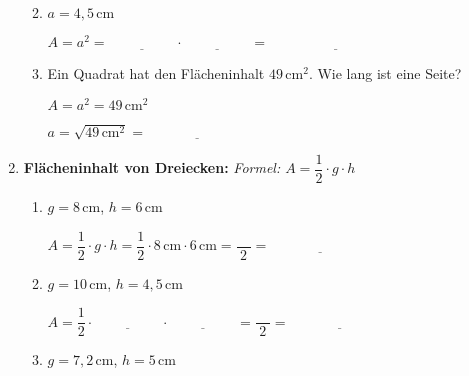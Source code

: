 \begin{enumerate}[label=\arabic*.]
\begin{enumerate}[label=\alph*)]
        \vspace{0.5cm}

        \item $a = 4{,}5\,\text{cm}$

        $A = a^2 = \underline{\hspace{2cm}} \cdot \underline{\hspace{2cm}} = \underline{\hspace{4cm}}$

        \vspace{0.5cm}

        \item Ein Quadrat hat den Flächeninhalt $49\,\text{cm}^2$. Wie lang ist eine Seite?

        $A = a^2 = 49\,\text{cm}^2$

        $a = \sqrt{49\,\text{cm}^2} = \underline{\hspace{3cm}}$
    \end{enumerate}

    \vspace{1cm}

    \item \textbf{Flächeninhalt von Dreiecken:}
    \textit{Formel: $A = \dfrac{1}{2} \cdot g \cdot h$}
    \vspace{0.5cm}

    \begin{enumerate}[label=\alph*)]
        \item $g = 8\,\text{cm}$, $h = 6\,\text{cm}$

        $A = \dfrac{1}{2} \cdot g \cdot h = \dfrac{1}{2} \cdot 8\,\text{cm} \cdot 6\,\text{cm} = \dfrac{\phantom{00}}{2} = \underline{\hspace{3cm}}$

        \vspace{0.5cm}

        \item $g = 10\,\text{cm}$, $h = 4{,}5\,\text{cm}$

        $A = \dfrac{1}{2} \cdot \underline{\hspace{2cm}} \cdot \underline{\hspace{2cm}} = \dfrac{\phantom{00}}{2} = \underline{\hspace{3cm}}$

        \vspace{0.5cm}

        \item $g = 7{,}2\,\text{cm}$, $h = 5\,\text{cm}$


\end{enumerate}
\end{enumerate}
